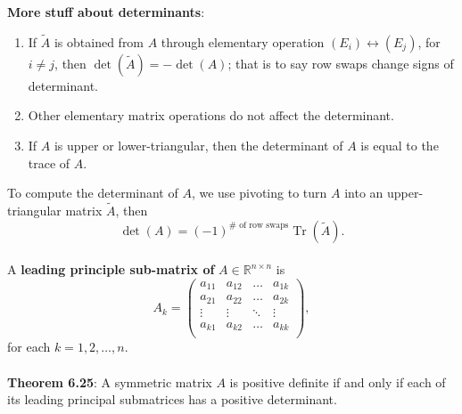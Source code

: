 \documentclass{article}
\DeclareMathOperator{\Trace}{Tr}
\begin{document}
\textbf{More stuff about determinants}: \begin{enumerate}
    \item If $\widetilde{A}$ is obtained from $A$ through elementary operation $(E_i) \leftrightarrow (E_j)$, for $i \neq j$, then $\det(\widetilde{A}) = -\det(A)$; that is to say row swaps change signs of determinant.
    \item Other elementary matrix operations do not affect the determinant.
    \item If $A$ is upper or lower-triangular, then the determinant of $A$ is equal to the trace of $A$.
\end{enumerate} $ $ \\
To compute the determinant of $A$, we use pivoting to turn $A$ into an upper-triangular matrix $\widetilde{A}$, then $$\det(A) = (-1)^{\# \text{ of row swaps}} \Trace(\widetilde{A}).$$ \\ 
A \textbf{leading principle sub-matrix of} $A \in \mathbb{R}^{n \times n}$ is $$A_k = \begin{pmatrix}
    a_{11} & a_{12} & \dots & a_{1k} \\
    a_{21} & a_{22} & \dots & a_{2k} \\
    \vdots & \vdots & \ddots & \vdots \\
    a_{k1} & a_{k2} & \dots & a_{kk} \\
\end{pmatrix},$$ for each $k = 1, 2, \dots, n$. \\ \\
\textbf{Theorem 6.25}: A symmetric matrix $A$ is positive definite if and only if each of its leading principal submatrices has a positive determinant. \\ \\
\end{document}
